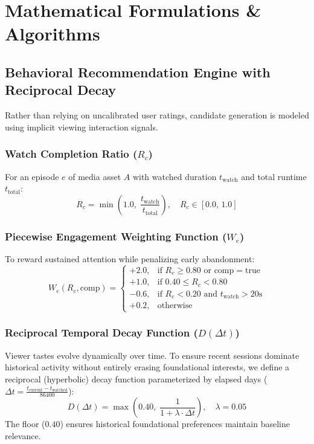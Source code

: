 \documentclass[conference]{IEEEtran}
\begin{document}
\section{Mathematical Formulations \& Algorithms}

\subsection{Behavioral Recommendation Engine with Reciprocal Decay}
Rather than relying on uncalibrated user ratings, candidate generation is modeled using implicit viewing interaction signals.

\subsubsection{Watch Completion Ratio ($R_c$)}
For an episode $e$ of media asset $A$ with watched duration $t_{\text{watch}}$ and total runtime $t_{\text{total}}$:
\begin{equation}
R_c = \min\left(1.0, \; \frac{t_{\text{watch}}}{t_{\text{total}}}\right), \quad R_c \in [0.0, \, 1.0]
\label{eq:ratio}
\end{equation}

\subsubsection{Piecewise Engagement Weighting Function ($W_e$)}
To reward sustained attention while penalizing early abandonment:
\begin{equation}
W_e(R_c, \text{comp}) = \begin{cases} 
+2.0, & \text{if } R_c \ge 0.80 \text{ or comp} = \text{true} \\ 
+1.0, & \text{if } 0.40 \le R_c < 0.80 \\ 
-0.6, & \text{if } R_c < 0.20 \text{ and } t_{\text{watch}} > 20\text{s} \\ 
+0.2, & \text{otherwise} 
\end{cases}
\label{eq:engagement}
\end{equation}

\subsubsection{Reciprocal Temporal Decay Function ($D(\Delta t)$)}
Viewer tastes evolve dynamically over time. To ensure recent sessions dominate historical activity without entirely erasing foundational interests, we define a reciprocal (hyperbolic) decay function parameterized by elapsed days ($\Delta t = \frac{t_{\text{current}} - t_{\text{watched}}}{86400}$):
\begin{equation}
D(\Delta t) = \max\left(0.40, \; \frac{1}{1 + \lambda \cdot \Delta t}\right), \quad \lambda = 0.05
\label{eq:decay}
\end{equation}
The floor ($0.40$) ensures historical foundational preferences maintain baseline relevance.
\end{document}
